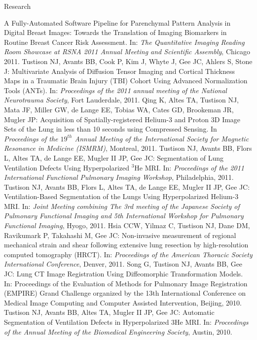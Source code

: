 \documentclass{resume}
\begin{document}
\begin{category}{Research}
\begin{itemize}
   A Fully-Automated Software Pipeline for Parenchymal Pattern Analysis in Digital Breast Images:
   Towards the Translation of Imaging Biomarkers in Routine Breast Cancer Risk Assessment.  In: 
   {\em The Quantitative Imaging Reading Room Showcase at RSNA 2011 Annual Meeting and Scientific Assembly}, 
   Chicago 2011.
   \citemnobullet Tustison NJ, Avants BB, Cook P, Kim J, Whyte J, Gee JC, Ahlers S, Stone J:  Multivariate
   Analysis of Diffusion Tensor Imaging and Cortical Thickness Maps in a Traumatic Brain Injury (TBI)
   Cohort Using Advanced Normalization Tools (ANTs).  In: {\em Proceedings of the 2011 
   annual meeting of the National Neurotrauma Society}, Fort Lauderdale, 2011.
   \citemnobullet Qing K, Altes TA, Tustison NJ, Mata JF, Miller GW, de Lange EE, Tobias WA, Cates GD, Brookeman JR,
   Mugler JP:  Acquisition of Spatially-registered Helium-3 and Proton 3D Image Sets of the Lung in less than 10 seconds using Compressed Sensing.  In {\em Proceedings of the $19^{th}$ Annual Meeting of the International Society for Magnetic Resonance in Medicine (ISMRM)}, Montreal, 2011.
   \citemnobullet Tustison NJ, Avants BB, Flors L, Altes TA, de Lange EE, Mugler II JP, Gee JC: Segmentation of Lung Ventilation Defects Using Hyperpolarized $^3$He MRI.  In:  {\em Proceedings of the 2011 International Functional Pulmonary Imaging Workshop}, Philadelphia, 2011.
   \citemnobullet Tustison NJ, Avants BB, Flors L, Altes TA, de Lange EE, Mugler II JP, Gee JC: Ventilation-Based Segmentation of the Lungs Using Hyperpolarized Helium-3 MRI.  In:  {\em Joint Meeting combining The 3rd meeting of the Japanese Society of Pulmonary Functional Imaging and 5th International Workshop for Pulmonary  Functional  Imaging}, Hyogo, 2011.
    \citemnobullet Hsia CCW, Yilmaz C, Tustison NJ, Dane DM, Ravikumark P, Takahashi M, Gee JC:  Non-invasive measurement of regional mechanical strain and shear following extensive lung resection by high-resolution computed tomography (HRCT).  In: {\em Proceedings of the American Thoracic Society International Conference}, Denver, 2011.
    \citemnobullet Song G, Tustison NJ, Avants BB, Gee JC:  Lung CT Image Registration Using Diffeomorphic Transformation Models. In: {Proceedings of the Evaluation of Methods for Pulmonary Image Registration (EMPIRE) Grand Challenge organized by the 13th International Conference on Medical Image Computing and Computer Assisted Intervention}, Beijing, 2010.
    \citemnobullet Tustison NJ, Avants BB, Altes TA, Mugler II JP, Gee JC:  Automatic Segmentation of Ventilation Defects in Hyperpolarized 3He MRI.  In:  {\em Proceedings of the Annual Meeting of the Biomedical Engineering Society}, Austin, 2010.

\end{itemize}
\end{category}
\end{document}
